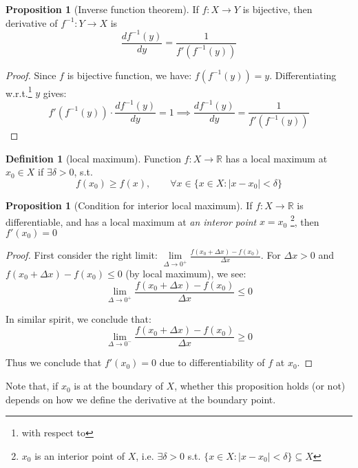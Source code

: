\documentclass[12pt]{article}
\newcommand{\R}{{\mathbb R}}
\theoremstyle{definition}
\newtheorem{definition}[theorem]{Definition}
\newtheorem{proposition}[theorem]{Proposition}
\theoremstyle{plain}
\begin{document}
\begin{proposition}
    [Inverse function theorem]
    If $f: X \to Y$ is bijective, then derivative of $f^{-1}: Y \to X$ is
    \[
        \frac{d f^{-1}(y)}{dy } = \frac{1}{f'(f^{-1}(y))}
    \]
    \begin{proof}
        Since $f$ is bijective function, we have:
        $f(f^{-1}(y)) = y$. Differentiating w.r.t.\footnote{with respect
        to} $y$ gives:
        \[
            f'(f^{-1} (y)) \cdot \frac{d f^{-1}(y)}{dy } = 1
            \implies
            \frac{d f^{-1}(y)}{dy } = \frac{1}{f'(f^{-1}(y))}
        \]
    \end{proof}
\end{proposition}

\begin{definition}
    [local maximum]
    Function $f: X \to \R$ has a local maximum at $x_0 \in X$ if $\exists \delta
    > 0$, s.t.
    \[
        f(x_0) \ge f(x), \qquad \forall x \in \{ x \in X: |x - x_0| < \delta\}
    \]
\end{definition}

\begin{proposition}
    [Condition for interior local maximum]
    If $f: X \to \R$ is differentiable, and has a local maximum at
    \textit{an interor point} $x = x_0$
    \footnote{$x_0$ is an interior point of $X$, i.e. $\exists \delta > 0$ s.t. $\{x \in
    X: |x - x_0| < \delta\} \subseteq X$}, then $f'(x_0) = 0$

    \begin{proof}
        First consider the right limit:
        $
        \underset{\Delta \to 0^+} \lim \frac{f(x_0+\Delta x) - f(x_0)}{\Delta x}
        $. For $\Delta x > 0$ and $f(x_0+\Delta x) -f (x_0) \le 0$ (by local
        maximum), we see:
        \[
        \underset{\Delta \to 0^+} \lim \frac{f(x_0+\Delta x) - f(x_0)}{\Delta x} \le 0
        \]

        In similar spirit, we conclude that:
        \[
        \underset{\Delta \to 0^-} \lim \frac{f(x_0+\Delta x) - f(x_0)}{\Delta x} \ge 0
        \]

        Thus we conclude that $f'(x_0) = 0$ due to differentiability of $f$ at
        $x_0$.

    \end{proof}

    Note that, if $x_0$ is at the boundary of $X$, whether this proposition
    holds (or not) depends on how we define the derivative at the boundary point.
\end{proposition}
\end{document}
